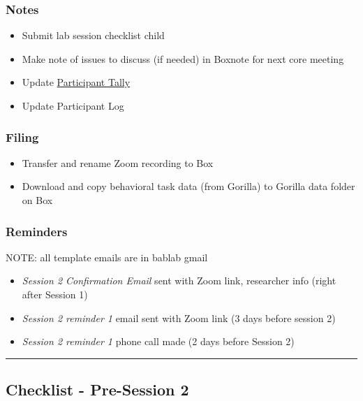 \documentclass[]{book}
\providecommand{\tightlist}{%
  \setlength{\itemsep}{0pt}\setlength{\parskip}{0pt}}
\begin{document}
\hypertarget{notes-1}{%
\subsubsection{Notes}\label{notes-1}}

\begin{itemize}
\tightlist
\item
  Submit lab session checklist child
\item
  Make note of issues to discuss (if needed) in Boxnote for next core meeting
\item
  Update \href{https://ucla.app.box.com/file/724688028024}{Participant Tally}
\item
  Update Participant Log
\end{itemize}

\hypertarget{filing-2}{%
\subsubsection{Filing}\label{filing-2}}

\begin{itemize}
\tightlist
\item
  Transfer and rename Zoom recording to Box
\item
  Download and copy behavioral task data (from Gorilla) to Gorilla data folder on Box
\end{itemize}

\hypertarget{reminders-1}{%
\subsubsection{Reminders}\label{reminders-1}}

NOTE: all template emails are in bablab gmail

\begin{itemize}
\tightlist
\item
  \emph{Session 2 Confirmation Email} sent with Zoom link, researcher info (right after Session 1)
\item
  \emph{Session 2 reminder 1} email sent with Zoom link (3 days before session 2)
\item
  \emph{Session 2 reminder 1} phone call made (2 days before Session 2)
\end{itemize}

\begin{center}\rule{0.5\linewidth}{0.5pt}\end{center}

\hypertarget{checklist---pre-session-2}{%
\subsection{Checklist - Pre-Session 2}\label{checklist---pre-session-2}}
\end{document}
